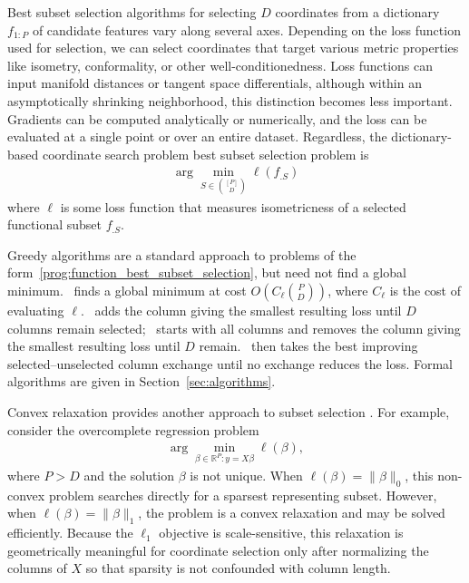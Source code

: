 Best subset selection algorithms for selecting $D$ coordinates from a dictionary $f_{1:P}$ of candidate features vary along several axes\citep{Kohli2021-lr, Koelle2022-ju, Koelle2024-no}.
Depending on the loss function used for selection, we can select coordinates that target various metric properties like isometry, conformality, or other well-conditionedness.
Loss functions can input manifold distances or tangent space differentials, although within an asymptotically shrinking neighborhood, this distinction becomes less important.
Gradients can be computed analytically or numerically, and the loss can be evaluated at a single point or over an entire dataset.
Regardless, the dictionary-based coordinate search problem best subset selection problem is
\begin{align}
\label{prog:function_best_subset_selection}
\arg \min_{ S \in \binom{[P]}{D}} \ell ( f_{. S})
\end{align}
where $\ell$ is some loss function that measures isometricness of a selected functional subset $f_{. S}$.

Greedy algorithms are a standard approach to problems of the form~\eqref{prog:function_best_subset_selection}, but need not find a global minimum.
\brute~finds a global minimum at cost $O(C_\ell\binom{P}{D})$, where $C_\ell$ is the cost of evaluating $\ell$.
\greedy~adds the column giving the smallest resulting loss until $D$ columns remain selected; \backwardgreedy~starts with all columns and removes the column giving the smallest resulting loss until $D$ remain.
\forwardbackward~then takes the best improving selected--unselected column exchange until no exchange reduces the loss.
Formal algorithms are given in Section~\ref{sec:algorithms}.

Convex relaxation provides another approach to subset selection \citep{Liberti2004-iu, Abdi2013-th, Zhou2021-zz}.
For example, consider the overcomplete regression problem \citep{Chen2001-hh}
\begin{align}
\arg \min_{\beta \in \mathbb R^P : y  = X\beta} \ell(\beta),
\end{align}
where $P>D$ and the solution $\beta$ is not unique.
When $\ell(\beta) = \|\beta\|_0$, this non-convex problem searches directly for a sparsest representing subset.
However, when $\ell(\beta) =\|\beta\|_1$, the problem is a convex relaxation and may be solved efficiently.
Because the $\ell_1$ objective is scale-sensitive, this relaxation is geometrically meaningful for coordinate selection only after normalizing the columns of $X$ so that sparsity is not confounded with column length.


